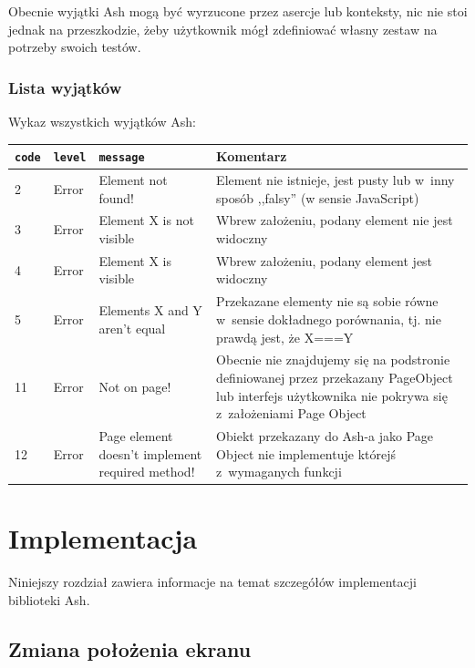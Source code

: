 \documentclass{xmgr}
\begin{document}
Obecnie wyjątki Ash mogą być wyrzucone przez asercje lub konteksty, nic nie stoi jednak na przeszkodzie, żeby użytkownik mógł zdefiniować własny zestaw na potrzeby swoich testów.  

\subsection{Lista wyjątków}

Wykaz wszystkich wyjątków Ash:
\begin{center}
    \begin{tabularx}{\textwidth}{ | p{1cm} | p{2cm} | X | X |}
    \hline
    \texttt{code} & \texttt{level} & \texttt{message} & Komentarz \\ \hline
    2 & Error & Element not found! & Element nie istnieje, jest pusty lub w~inny sposób ,,falsy'' (w sensie JavaScript)  \\ \hline
    3 & Error & Element X is not visible & Wbrew założeniu, podany element nie jest widoczny  \\ \hline
    4 & Error & Element X is visible & Wbrew założeniu, podany element jest widoczny  \\ \hline
    5 & Error & Elements X and Y aren't equal & Przekazane elementy nie są sobie równe w~sensie dokładnego porównania, tj.  nie prawdą jest, że X===Y  \\ \hline
    11 & Error & Not on page! & Obecnie nie znajdujemy się na podstronie definiowanej przez przekazany PageObject lub interfejs użytkownika nie pokrywa się z~założeniami Page Object  \\ \hline
    12 & Error & Page element doesn't implement required method! & Obiekt przekazany do Ash-a jako Page Object nie implementuje którejś z~wymaganych funkcji  \\ \hline
    \end{tabularx}
\end{center}

\chapter{Implementacja}

Niniejszy rozdział zawiera informacje na temat szczegółów implementacji biblioteki Ash.

\section{Zmiana położenia ekranu}
\end{document}
